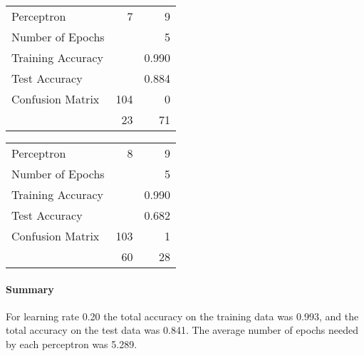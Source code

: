 \documentclass[11pt]{article}
\begin{document}
\begin{minipage}[t]{0.5\textwidth}
\begin{tabular}{|l | r r|}
\hline Perceptron & 7 & 9\\
Number of Epochs & & 5\\
Training Accuracy & & 0.990\\
Test Accuracy & & 0.884\\
Confusion Matrix & 104 & 0\\
 &23 & 71\\ \hline
\end{tabular}
\end{minipage}
\begin{minipage}[t]{0.5\textwidth}
\begin{tabular}{|l | r r|}
\hline Perceptron & 8 & 9\\
Number of Epochs & & 5\\
Training Accuracy & & 0.990\\
Test Accuracy & & 0.682\\
Confusion Matrix & 103 & 1\\
 &60 & 28\\ \hline
\end{tabular}
\end{minipage}
\paragraph{Summary} For learning rate 0.20 the total accuracy on the training data was 0.993, and the total accuracy on the test data was 0.841.  The average number of epochs needed by each perceptron was 5.289.
\end{document}
